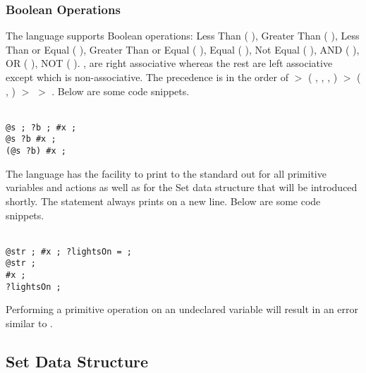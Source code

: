 \documentclass[11pt]{article}
\begin{document}
\subsubsection{Boolean Operations}
The language supports Boolean operations: Less Than ( \LT), Greater Than ( \GT), Less Than or Equal ( \LEQ), Greater Than or Equal ( \GEQ), Equal ( \EQ), Not Equal ( \NEQ), AND ( \AND), OR ( \OR), NOT ( \NOT). \AND, \OR are right associative whereas the rest are left associative except \NOT which is non-associative. The precedence is in the order of  \NOT $>$ ( \LT, \GT, \LEQ, \GEQ) $>$ ( \EQ, \NEQ) $>$ \AND $>$ \OR .
\newpage
Below are some code snippets.

\begin{texto}
	\texttt{\\
		\LET @s \ASS {};
		\LET ?b \ASS \TRUE;
		\LET \#x ;	\\	
		@s \EQ {} \OR ?b \AND \#x ; \\		
		(@s \EQ {} \OR ?b) \AND \#x ;	
	 }
\end{texto}

The language has the facility to print to the standard out for all primitive variables and actions as well as for the Set data structure that will be introduced shortly. The \PRINT statement always prints on a new line. Below are some code snippets.

\begin{texto}
	\texttt{\\
		\LET @str \ASS {};
		\LET \#x ;
		\LET ?lightsOn = \TRUE; \\
		\PRINT @str \CAT {};  \\
		 \PLUS \#x ;  \\
		\PRINT ?lightsOn \EQ \TRUE;  
	 }
\end{texto}

Performing a primitive operation on an undeclared variable will result in an error similar to .

\subsection{Set Data Structure}
\end{document}
